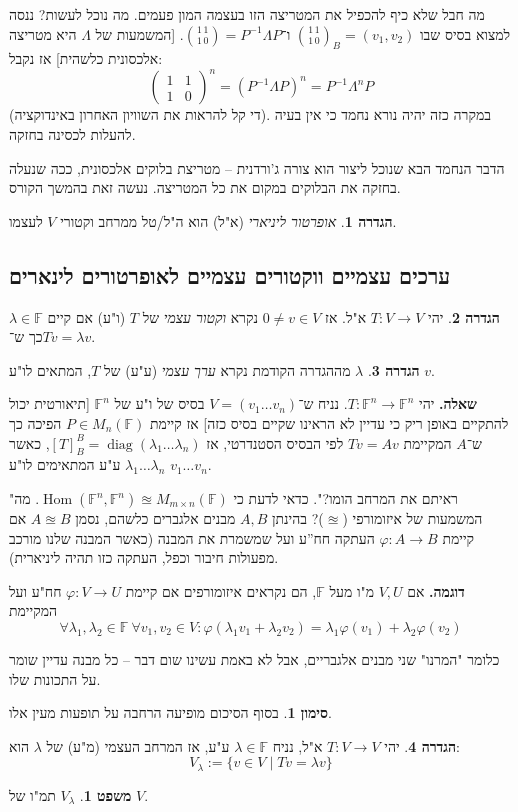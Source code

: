 \documentclass[a4paper]{article}
\DeclareMathOperator{\diag}    {diag}
\DeclareMathOperator{\Hom}     {Hom}
\newcommand\F         {\mathbb{F}}
\newcommand\co        {\colon}
\newcommand\pms[1]    {\begin{pmatrix}
		#1
\end{pmatrix}}
\renewcommand\lg      {\lambda}
\newcommand\op    {^{-1}}
\newcommand\cl [1]    {\left ( #1 \right )}
\renewcommand\phi     {\varphi}
\theoremstyle{definition}
\newtheorem{Theorem}{משפט}
\newtheorem{definition}{הגדרה}
\newtheorem{Notion}{סימון}
\newcommand\theo  [1] {\begin{Theorem}#1\end{Theorem}}
\newcommand\defi  [1] {\begin{definition}#1\end{definition}}
\newcommand\noti  [1] {\begin{Notion}#1\end{Notion}}
\begin{document}
	מה חבל שלא כיף להכפיל את המטריצה הזו בעצמה המון פעמים. מה נוכל לעשות? ננסה למצוא בסיס שבו $\binom{1 \, 1}{1\, 0}_B = (v_1, v_2)$ ו־$\binom{1 \, 1}{1 \, 0} = P\op \Lambda P$. [המשמעות של $\Lambda$ היא מטריצה אלכסונית כלשהית] אז נקבל: 
	\[ \pms{1 & 1 \\ 1 & 0}^{n} = \cl{P\op \Lambda P}^{n} = P\op\Lambda^nP \]
	(די קל להראות את השוויון האחרון באינדוקציה). במקרה כזה יהיה נורא נחמד כי אין בעיה להעלות לכסינה בחזקה. 
	
	הדבר הנחמד הבא שנוכל ליצור הוא צורה ג'ורדנית – מטריצת בלוקים אלכסונית, ככה שנעלה בחזקה את הבלוקים במקום את כל המטריצה. נעשה זאת בהמשך הקורס. 
	
	\defi{\textit{אופרטור ליניארי} (א"ל) הוא ה"ל/טל ממרחב וקטורי $V$ לעצמו. }
	
	
	\subsection{ערכים עצמיים ווקטורים עצמיים לאופרטורים לינארים}
	\defi{יהי $T \co V \to V$ א"ל. אז $0 \neq v \in V$ נקרא \textit{וקטור עצמי} של $T$ (ו"ע) אם קיים $\lg \in \F$ כך ש־$T v =\lg v$. }
	
	\defi{$\lg$ מההגדרה הקודמת נקרא \textit{ערך עצמי} (ע"ע) של $T$, המתאים לו"ע $v$. }
	
	\textbf{שאלה. }יהי $T \co \F^n \to \F^n$. נניח ש־$V = (v_1 \dots v_n)$ בסיס של ו"ע של $\F^n$ [תיאורטית יכול להתקיים באופן ריק כי עדיין לא הראינו שקיים בסיס כזה] אז קיימת $P \in M_n(\F)$ הפיכה כך ש־$A$ המקיימת $Tv = Av$ לפי הבסיס הסטנדרטי, אז $[T]^B_B = \diag(\lg_1 \dots \lg_n)$, כאשר $\lg_1 \dots \lg_n$ ע"ע המתאימים לו"ע $v_1 \dots v_n$. 
	
	"ראיתם את המרחב הומו?".
	כדאי לדעת כי $\Hom(\F^n, \F^n) \approxeq M_{m \times n}(\F)$. מה המשמעות של איזומורפי ($\approxeq$)? בהינתן $A, B$ מבנים אלגברים כלשהם, נסמן $A \approxeq B$ אם קיימת $\phi \co A \to B$ העתקה חח''ע ועל שמשמרת את המבנה (כאשר המבנה שלנו מורכב מפעולות חיבור וכפל, העתקה כזו תהיה ליניארית). 
	
	\textbf{דוגמה. }אם $V, U$ מ"ו מעל $\F$, הם נקראים איזומורפים אם קיימת $\phi \co V \to U$ חח"ע ועל המקיימת
	\[ \forall \lg_1, \lg_2 \in \F\: \forall v_1, v_2 \in V \co \phi(\lg_1v_1 + \lg_2v_2) = \lg_1\phi(v_1) + \lg_2\phi(v_2) \]
	
	כלומר "המרנו" שני מבנים אלגבריים, אבל לא באמת עשינו שום דבר – כל מבנה עדיין שומר על התכונות שלו. 
	\noti{בסוף הסיכום מופיעה הרחבה על תופעות מעין אלו. }
	
	\defi{יהי $T \co V \to V$ א"ל, נניח $\lg \in \F$ ע"ע, אז המרחב העצמי (מ"ע) של $\lg$ הוא: 
		\[ V_\lg := \{v \in V \mid Tv = \lg v\} \]}
	\theo{$V_\lg$ תמ"ו של $V$. }
	
\end{document}
